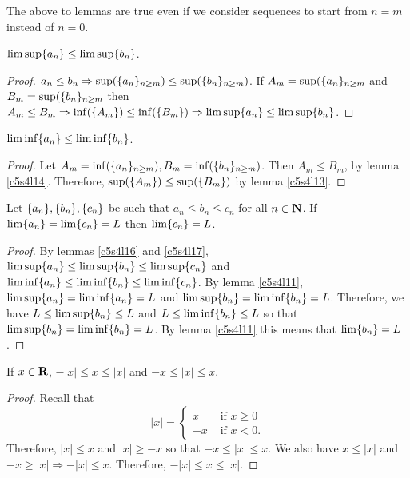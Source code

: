 \begin{rem}
The above to lemmas are true even if we consider sequences to start from
$n = m$ instead of $n = 0$.
\end{rem}

\begin{lem}\label{c5s4l15}
$\limsup\{a_n\} \le \limsup\{b_n\}$.
\end{lem}
\begin{proof}
$a_n \le b_n \Rightarrow \sup(\{a_n\}_{n \ge m}) \le 
\sup(\{b_n\}_{n \ge m})$. If $A_m = \sup(\{a_n\}_{n \ge m}$ and $B_m =
\sup(\{b_n\}_{n \ge m}$ then $A_m \le B_m \Rightarrow \inf(\{A_m\}) \le
\inf(\{B_m\}) \Rightarrow \limsup\{a_n\} \le \limsup\{b_n\}$.
\end{proof}

\begin{lem}\label{c5s4l16}
$\liminf\{a_n\} \le \liminf\{b_n\}$.
\end{lem}
\begin{proof}
Let $A_m = \inf(\{a_n\}_{n \ge m}), B_m = \inf(\{b_n\}_{n \ge m})$.
Then $A_m \le B_m$, by lemma \ref{c5s4l14}. Therefore, $\sup(\{A_m\}) 
\le \sup(\{B_m\})$ by lemma \ref{c5s4l13}.
\end{proof}

\begin{lem}\label{c5s4l17}
Let $\{a_n\}, \{b_n\}, \{c_n\}$ be such that $a_n \le b_n \le c_n$
for all $n \in \mathbf{N}$. If $\lim\{a_n\} = \lim\{c_n\} = L$ then $\lim\{c_n\} = L$.
\end{lem}
\begin{proof}
By lemmas \ref{c5s4l16} and \ref{c5s4l17}, $\limsup\{a_n\} \le \limsup\{b_n\} \le \limsup\{c_n\}$ and $\liminf\{a_n\} \le \liminf\{b_n\} \le
\liminf\{c_n\}$. By lemma \ref{c5s4l11}, $\limsup\{a_n\} = 
\liminf\{a_n\} = L$ and $\limsup\{b_n\} = \liminf\{b_n\} = L$. 
Therefore, we have $L \le \limsup\{b_n\} \le L$ and $L \le \liminf\{b_n\}
\le L$ so that $\limsup\{b_n\} = \liminf\{b_n\} = L$. By lemma 
\ref{c5s4l11} this means that $\lim\{b_n\} = L$.
\end{proof}

\begin{lem}\label{c5s4l18}
If $x \in \mathbf{R}$, $-|x| \le x \le |x|$ and $-x \le |x| \le x$.
\end{lem}
\begin{proof}
Recall that
\[
|x| = \begin{cases} x & \text{ if } x \ge 0 \\
-x & \text{ if } x < 0.
\end{cases}
\]
Therefore, $|x| \le x$ and $|x| \ge -x$ so that $-x \le |x| \le x$. We also
have $x \le |x|$ and $-x \ge |x| \Rightarrow -|x| \le x$. Therefore, $-|x|
\le x \le |x|$.
\end{proof}

